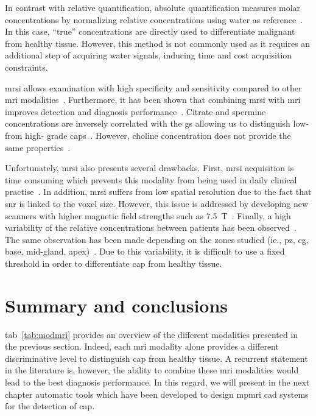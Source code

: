 In contrast with relative quantification, absolute quantification measures molar concentrations by normalizing relative concentrations using water as reference~\cite{Lemaitre2011}.
In this case, ``true'' concentrations are directly used to differentiate malignant from healthy tissue.
However, this method is not commonly used as it requires an additional step of acquiring water signals, inducing time and cost acquisition constraints.

\ac{mrsi} allows examination with high specificity and sensitivity compared to other \ac{mri} modalities~\cite{Choi2007}.
Furthermore, it has been shown that combining \ac{mrsi} with \ac{mri} improves detection and diagnosis performance~\cite{Scheidler1999a,Kaji1998,Vilanova2009}.
Citrate and spermine concentrations are inversely correlated with the \ac{gs} allowing us to distinguish low- from high- grade \acp{cap}~\cite{Giskeodegard2013}.
However, choline concentration does not provide the same properties~\cite{Giskeodegard2013}.

Unfortunately, \ac{mrsi} also presents several drawbacks.
First, \ac{mrsi} acquisition is time consuming which prevents this modality from being used in daily clinical practise~\cite{Barentsz2012}.
In addition, \ac{mrsi} suffers from low spatial resolution due to the fact that \ac{snr} is linked to the voxel size.
However, this issue is addressed by developing new scanners with higher magnetic field strengths such as \SI{7.5}{\tesla}~\cite{Giskeodegard2013}.
Finally, a high variability of the relative concentrations between patients has been observed~\cite{Choi2007}.
The same observation has been made depending on the zones studied (ie., \ac{pz}, \ac{cg}, base, mid-gland, apex)~\cite{Walker2010,Lemaitre2011}.
Due to this variability, it is difficult to use a fixed threshold in order to differentiate \ac{cap} from healthy tissue.

\section{Summary and conclusions}

\acs{tab}~\ref{tab:modmri} provides an overview of the different modalities presented in the previous section.
Indeed, each \ac{mri} modality alone provides a different discriminative level to distinguish \ac{cap} from healthy tissue.
A recurrent statement in the literature is, however, the ability to combine these \ac{mri} modalities would lead to the best diagnosis performance.
In this regard, we will present in the next chapter automatic tools which have been developed to design \ac{mpmri} \ac{cad} systems for the detection of \ac{cap}.


